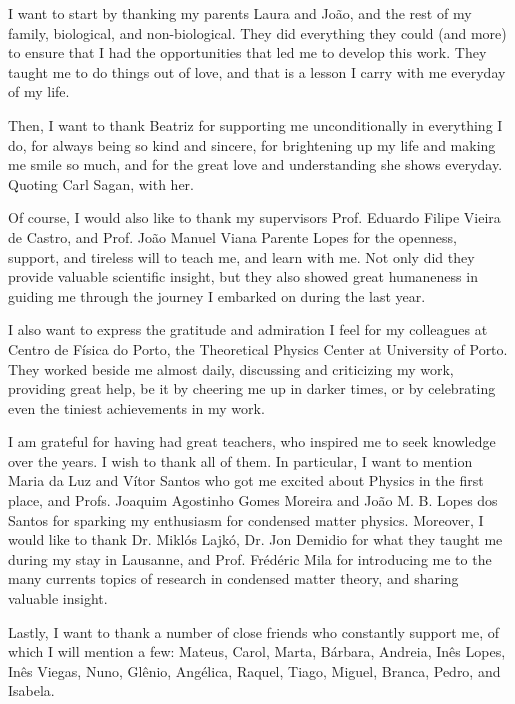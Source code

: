 
\begin{acknowledgments} 

I want to start by thanking my parents Laura and João, and the rest of my family, biological, and non-biological.
They did everything they could (and more) to ensure that I had the opportunities that led me to develop this work.
They taught me to do things out of love, and that is a lesson I carry with me everyday of my life.

Then, I want to thank Beatriz for supporting me unconditionally in everything I do, for always being  so kind and sincere, for brightening up my life and making me smile so much, and for the great love and understanding she shows everyday.
Quoting Carl Sagan,  with her.

Of course, I would also like to thank my supervisors Prof. Eduardo Filipe Vieira de Castro, and Prof. João Manuel Viana Parente Lopes for the openness, support, and tireless will to teach me, and learn with me.
Not only did they provide valuable scientific insight, but they also showed great humaneness in guiding me through the journey I embarked on during the last year.

I also want to express the gratitude and admiration I feel for my colleagues at Centro de Física do Porto, the Theoretical Physics Center at University of Porto.
They worked beside me almost daily, discussing and criticizing my work, providing great help, be it by cheering me up in darker times, or by celebrating even the tiniest achievements in my work.

I am grateful for having had great teachers, who inspired me to seek knowledge over the years. I wish to thank all of them. In particular, I want to mention Maria da Luz and Vítor Santos who got me excited about Physics in the first place, and Profs. Joaquim Agostinho Gomes Moreira and João M. B. Lopes dos Santos for sparking my enthusiasm for condensed matter physics. Moreover, I would like to thank Dr. Miklós Lajkó, Dr. Jon Demidio for what they taught me during my stay in Lausanne, and Prof. Frédéric Mila for introducing me to the many currents topics of research in condensed matter theory, and sharing valuable insight.

Lastly, I want to thank a number of close friends who constantly support me, of which I will mention a few: Mateus, Carol, Marta, Bárbara, Andreia, Inês Lopes, Inês Viegas, Nuno, Glênio, Angélica, Raquel, Tiago, Miguel, Branca, Pedro, and Isabela. 

\end{acknowledgments}
\clearpage
\thispagestyle{empty}
\cleardoublepage